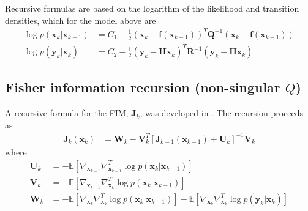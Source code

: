 \documentclass{article}
\renewcommand{\vec}[1]{\ensuremath{{\boldsymbol #1}}}
\newcommand{\mat}[1]{\ensuremath{\boldsymbol{#1}}}
\begin{document}
Recursive formulas are based on the logarithm of the likelihood and transition densities, which for the model above are
\begin{align}
	\log p(\vec x_k|\vec x_{k-1}) &= C_1 -\frac{1}{2}(\vec x_k - \vec f(\vec x_{k-1}))^T \mat Q^{-1} (\vec x_k - \vec f(\vec x_{k-1})) \\
	\log p(\vec y_k|\vec x_k) &= C_2 -\frac{1}{2}(\vec y_k - \mat H\vec x_k)^T \mat R^{-1} (\vec y_k - \mat H\vec x_k)
\end{align}

\subsection{Fisher information recursion (non-singular $Q$)} 
A recursive formula for the FIM, $\mat J_k$, was developed in \cite{Tichavsky1998}. The recursion proceeds as
\begin{align}
	\mat J_k(\vec x_k) &= \mat W_k - \mat V_k^T\left[ \mat J_{k-1}(\vec x_{k-1}) + \mat U_k\right]^{-1}\mat V_k 
\end{align}
where
\begin{align}
	\mat U_k &= -\mathbb E\left[ \nabla_{\vec x_{k-1}}\nabla_{\vec x_{k-1}}^T \log p(\vec x_k|\vec x_{k-1}) \right] \label{eqn:recursion_U}\\
	\mat V_k &= -\mathbb E\left[ \nabla_{\vec x_{k-1}}\nabla_{\vec x_k}^T \log p(\vec x_k|\vec x_{k-1}) \right] \label{eqn:recursion_V}\\
	\mat W_k &= -\mathbb E\left[ \nabla_{\vec x_k}\nabla_{\vec x_k}^T \log p(\vec x_k|\vec x_{k-1}) \right] - \mathbb E\left[ \nabla_{\vec x_k}\nabla_{\vec x_k}^T \log p(\vec y_k|\vec x_k) \right] \label{eqn:recursion_W}
\end{align}
\end{document}
